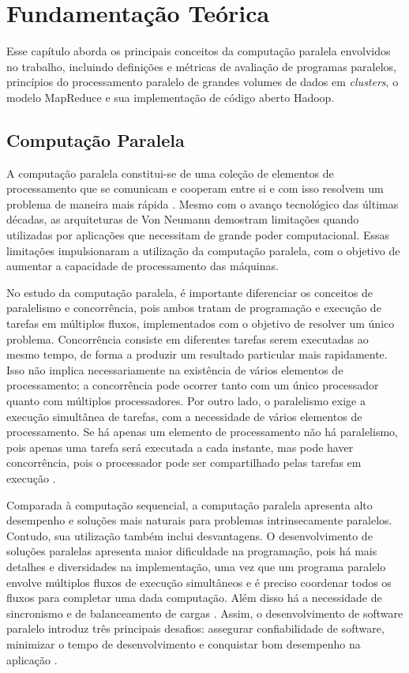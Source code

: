 %
%

\chapter{Fundamentação Teórica}
\label{chap:fundamentacaoTeorica}

Esse capítulo aborda os principais conceitos da computação paralela envolvidos no trabalho, incluindo definições e métricas de avaliação de programas paralelos,
princípios do processamento paralelo de grandes volumes de dados em \textit{clusters}, o modelo MapReduce e sua implementação de código aberto Hadoop.


\section{Computação Paralela}
\label{sec:computacaoparalela}

A computação paralela constitui-se de uma coleção de elementos de processamento que se comunicam e cooperam entre si e com isso resolvem um problema de maneira mais rápida \cite{Almasi:1994}. Mesmo com o avanço tecnológico das últimas décadas, as arquiteturas de Von Neumann demostram limitações quando utilizadas por aplicações que necessitam de grande poder computacional. Essas limitações impulsionaram a utilização da computação paralela, com o objetivo de aumentar a capacidade de processamento das máquinas.

No estudo da computação paralela, é importante diferenciar os conceitos de paralelismo e concorrência, pois ambos tratam de programação e execução de tarefas em múltiplos fluxos, implementados com o objetivo de resolver um único problema. Concorrência consiste em diferentes tarefas serem executadas ao mesmo tempo, de forma a produzir um resultado particular mais rapidamente. Isso não implica necessariamente na existência de vários elementos de processamento; a concorrência pode ocorrer tanto com um único processador quanto com múltiplos processadores. 
Por outro lado, o paralelismo exige a execução simultânea de tarefas, com a necessidade de vários elementos de processamento. 
Se há apenas um elemento de processamento não há paralelismo, pois apenas uma tarefa será executada a cada instante, mas pode haver concorrência, pois o processador pode ser compartilhado pelas tarefas em execução \cite{Breshears:2009}.

Comparada à computação sequencial, a computação paralela apresenta alto desempenho e soluções mais naturais para problemas intrinsecamente paralelos. Contudo, sua utilização também inclui desvantagens. O desenvolvimento de soluções paralelas apresenta maior dificuldade na programação, pois há mais detalhes e diversidades na implementação, uma vez que um programa paralelo envolve múltiplos fluxos de execução simultâneos e é preciso coordenar todos os fluxos para completar uma dada computação. Além disso há a necessidade de sincronismo e de balanceamento de cargas \cite{Rauber:2010}. 	Assim, o desenvolvimento de software paralelo introduz três principais desafios: assegurar confiabilidade de software, minimizar o tempo de desenvolvimento e conquistar bom desempenho na aplicação \cite{Leiserson:2008}.

